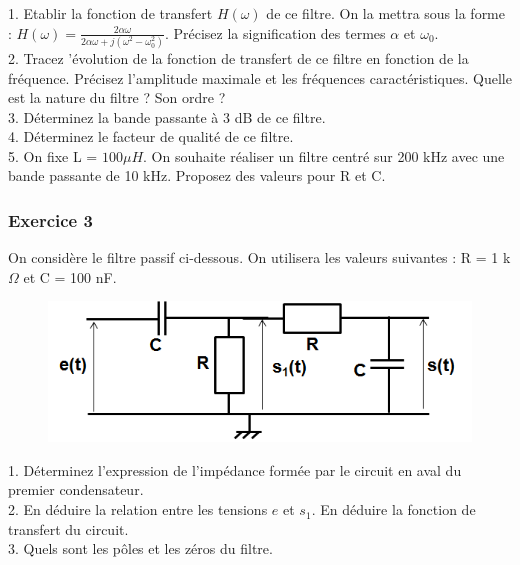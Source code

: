	1. Etablir la fonction de transfert $H(\omega)$ de ce filtre. On la mettra sous la forme : $H(\omega)=\frac{2\alpha \omega}{2\alpha \omega+j(\omega^{2}-\omega_{0}^{2})}$. Précisez la signification des termes $\alpha$ et $\omega_{0}$.\\
	
	2. Tracez 'évolution de la fonction de transfert de ce filtre en fonction de la fréquence. Précisez l'amplitude maximale et les fréquences caractéristiques. Quelle est la nature du filtre ? Son ordre ?\\
	
	3. Déterminez la bande passante à 3 dB de ce filtre. \\
	
	4. Déterminez le facteur de qualité de ce filtre. \\
	
	5. On fixe L = $100 \mu H$. On souhaite réaliser un filtre centré sur 200 kHz avec une bande passante de 10 kHz. Proposez des valeurs pour R et C.\\
	
	
	\subsubsection{Exercice 3}
	On considère le filtre passif ci-dessous. On utilisera les valeurs suivantes : R = 1 k$\Omega$ et C = 100 nF.
	
	\begin{figure}[h!]
		\centering
		\includegraphics[scale=0.5]{images/Exo_4_3.png} 
	\end{figure}
	
	
	1. Déterminez l'expression de l'impédance formée par le circuit en aval du premier condensateur.\\
	
	2. En déduire la relation entre les tensions $e$ et $s_1$. En déduire la fonction de transfert du circuit.\\
	
	3. Quels sont les pôles et les zéros du filtre. \\
	

